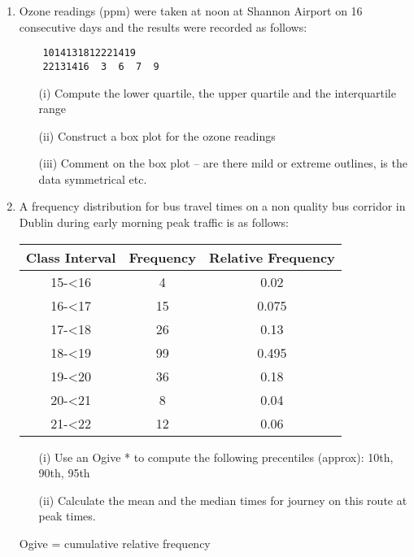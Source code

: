 \documentclass[]{report}
\begin{document}
	
\begin{enumerate}
	\item 
	
	Ozone readings (ppm) were taken at noon at Shannon Airport on 16 consecutive days and the results were recorded as follows:
	
	\begin{verbatim} 
	1014131812221419
	22131416  3  6  7  9
	\end{verbatim}
	
	\begin{itemize}
		\item[(i)]                   Compute the lower quartile, the upper quartile and the interquartile range
		\item[(ii)]                Construct a box plot for the ozone readings
		\item[(iii)]               Comment on the box plot – are there mild or extreme outlines, is the data symmetrical etc.
	\end{itemize}
	
\item            
	A frequency distribution for bus travel times on a non quality bus corridor in Dublin during early morning peak traffic is as follows:
	\begin{tabular}{|c|c|c|}
	Class Interval&Frequency&Relative Frequency \\ \hline
	15-<16& 4&0.02 \\ \hline
	16-<17&15&0.075 \\ \hline
	17-<18&26&0.13 \\ \hline
	18-<19&99&0.495 \\ \hline
	19-<20&36&0.18 \\ \hline
	20-<21& 8&0.04 \\ \hline
	21-<22&12&0.06 \\ \hline

	\end{tabular} 

	\begin{itemize}
		\item[(i)]                  Use an Ogive * to compute the following precentiles (approx):
		10th, 90th, 95th
		\item[(ii)]                Calculate the mean and the median times for journey on this route at peak times.
	\end{itemize}
	Ogive = cumulative relative frequency
	
	

\end{enumerate}
\end{document}
